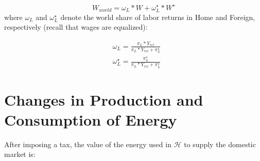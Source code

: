 \documentclass[notitlepage,12pt]{article}
\begin{document}
\begin{equation}
W_{world} = \omega_L*W + \omega_L^\star*W^\star
\end{equation}
where $\omega_L$ and $\omega_L^\star$ denote the world share of labor returns in Home and Foreign, respectively (recall that wages are equalized):

\begin{align}
&\omega_L = \frac{\pi_L*Y_{rel}}{\pi_L*Y_{rel} + \pi_L^\star}\\
&\omega_L^\star = \frac{\pi_L^\star}{\pi_L*Y_{rel} + \pi_L^\star}
\end{align}

\section{Changes in Production and Consumption of Energy}

After imposing a tax,  the value of the energy used in $\mathcal{H}$
to supply the domestic market is:
\end{document}
